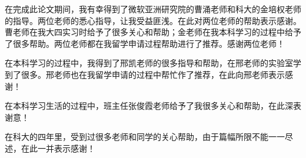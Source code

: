 \begin{acknowledgements}
在完成此论文期间，我有幸得到了微软亚洲研究院的曹涌老师和科大的金培权老师的指导。两位老师的悉心指导，让我受益匪浅。在此对两位老师的帮助表示感谢。曹老师在我大四实习时给予了很多关心和帮助；金老师在我本科学习的过程中给予了很多帮助。两位老师都在我留学申请过程帮助进行了推荐。感谢两位老师！

在本科学习的过程中，我得到了邢凯老师的很多指导和帮助，在邢老师的实验室学到了很多。邢老师也在我留学申请的过程中帮忙作了推荐，在此向邢老师表示感谢！

在本科学习生活的过程中，班主任张俊霞老师给予了我很多关心和帮助，在此深表谢意！

在科大的四年里，受到过很多老师和同学的关心帮助，由于篇幅所限不能一一尽述，在此一并表示感谢！

\end{acknowledgements}
